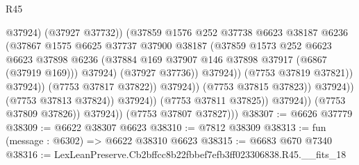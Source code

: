 \begin{lexlean}{R45}
\begin{coremodule}
{                                                  @37924)
                                                (@37927 @37732))
                                              (@37859
                                                @1576
                                                @252
                                                @37738
                                                @6623
                                                @38187
                                                @6236
                                                (@37867
                                                  @1575
                                                  @6625
                                                  @37737
                                                  @37900
                                                  @38187
                                                  (@37859
                                                    @1573
                                                    @252
                                                    @6623
                                                    @6623
                                                    @37898
                                                    @6236
                                                    (@37884
                                                      @169
                                                      @37907
                                                      @146
                                                      @37898
                                                      @37917
                                                      (@6867 (@37919 @169)))
                                                    @37924)
                                                  (@37927 @37736))
                                                @37924))
                                            (@7753 @37819 @37821))
                                          @37924))
                                      (@7753 @37817 @37822))
                                    @37924))
                                (@7753 @37815 @37823))
                              @37924))
                          (@7753 @37813 @37824))
                        @37924))
                    (@7753 @37811 @37825))
                  @37924))
              (@7753 @37809 @37826))
            @37924))
        (@7753 @37807 @37827)))
@38307 := @6626 @37779
@38309 := @6622 @38307 @6623
@38310 := @7812 @38309
@38313 := fun (message : @6302) => @6622 @38310 @6623
@38315 := @6683 @670 @7340
@38316 := LexLeanPreserve.Cb2bffcc8b22fbbef7efb3ff023306838.R45.__fits_18
}
\end{coremodule}
\end{lexlean}
